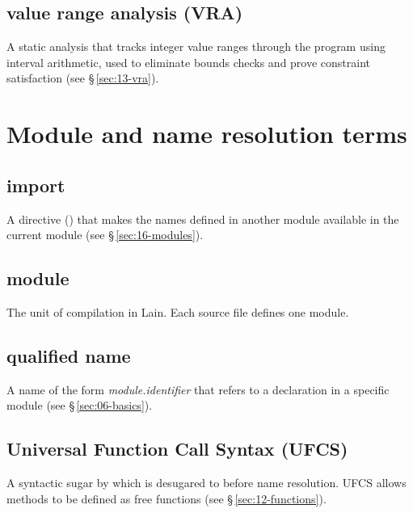 \subsection*{value range analysis (VRA)}
A static analysis that tracks integer value ranges through the program using
interval arithmetic, used to eliminate bounds checks and prove
constraint satisfaction (see \S\,\ref{sec:13-vra}).

\section{Module and name resolution terms}
\label{sec:terms.modules}

\subsection*{import}
A directive () that makes the names defined in
another module available in the current module
(see \S\,\ref{sec:16-modules}).

\subsection*{module}
The unit of compilation in Lain.  Each source file defines one module.

\subsection*{qualified name}
A name of the form \textit{module.identifier} that refers to a declaration
in a specific module (see \S\,\ref{sec:06-basics}).

\subsection*{Universal Function Call Syntax (UFCS)}
A syntactic sugar by which  is desugared to
 before name resolution.  UFCS allows methods to be
defined as free functions (see \S\,\ref{sec:12-functions}).
